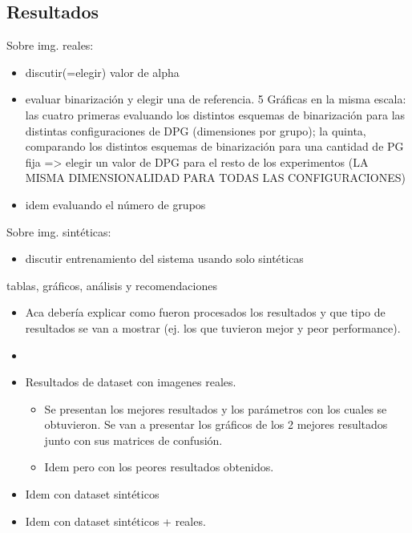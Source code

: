 \newpage
\subsection{Resultados}

\JS{====================}
 Sobre img. reales:
\begin{itemize}
	\item discutir(=elegir) valor de alpha
	\item evaluar binarización y elegir una de referencia. 5 Gráficas en la misma escala: las cuatro primeras evaluando los distintos esquemas de binarización para las distintas configuraciones de DPG (dimensiones por grupo); la quinta, comparando los distintos esquemas de binarización para una cantidad de PG fija => elegir un valor de DPG para el resto de los experimentos (LA MISMA DIMENSIONALIDAD PARA TODAS LAS CONFIGURACIONES)
	\item idem evaluando el número de grupos
\end{itemize}

Sobre img. sintéticas:
\begin{itemize}
	\item discutir entrenamiento del sistema usando solo sintéticas
\end{itemize}
\JS{====================}


\label{subsection:resultados}
	tablas, gráficos, análisis y recomendaciones
	\begin{itemize}
		\item Aca debería explicar como fueron procesados los
                  resultados y que tipo de resultados se van a mostrar (ej. los
                  que tuvieron mejor y peor performance). 
                \item {}
		\item Resultados de dataset con imagenes reales.
		\begin{itemize}
			\item Se presentan los mejores resultados y los parámetros con los cuales se obtuvieron. Se van a presentar los gráficos de los 2 mejores resultados junto con sus matrices de confusión.
			\item Idem pero con los peores resultados obtenidos.
		\end{itemize}
		\item Idem con dataset sintéticos
		\item Idem con dataset sintéticos + reales.

	\end{itemize}
	

